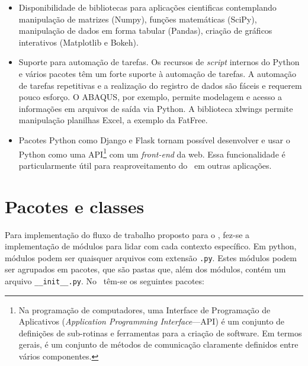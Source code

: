 \begin{itemize}
    \item Disponibilidade de bibliotecas para aplicações cientificas contemplando manipulação de matrizes (Numpy), funções matemáticas (SciPy), manipulação de dados em forma tabular (Pandas), criação de gráficos interativos (Matplotlib e Bokeh).

    \item Suporte para automação de tarefas. Os recursos de \textit{script} internos do Python e vários pacotes têm um forte suporte à automação de tarefas. A automação de tarefas repetitivas e a realização do registro de dados são fáceis e requerem pouco esforço. O ABAQUS, por exemplo, permite modelagem e acesso a informações em arquivos de saída via Python. A biblioteca xlwings permite manipulação planilhas Excel, a exemplo da FatFree.

    \item Pacotes Python como Django e Flask tornam possível desenvolver e usar o Python como uma API\footnote{Na programação de computadores, uma Interface de Programação de Aplicativos (\textit{Application Programming Interface}---API) é um conjunto de definições de sub-rotinas e ferramentas para a criação de software. Em termos gerais, é um conjunto de métodos de comunicação claramente definidos entre vários componentes.} com um \textit{front-end} da web. Essa funcionalidade é particularmente útil para reaproveitamento do \frame\  em outras aplicações.
\end{itemize}

\section{Pacotes e classes}

Para implementação do fluxo de trabalho proposto para o \frame, fez-se a implementação de módulos para lidar com cada contexto específico. Em python, módulos podem ser quaisquer arquivos com extensão \texttt{.py}. Estes módulos podem ser agrupados em pacotes, que são pastas que, além dos módulos, contém um arquivo \texttt{\_\_init\_\_.py}. No \frame\ têm-se os seguintes pacotes: %

